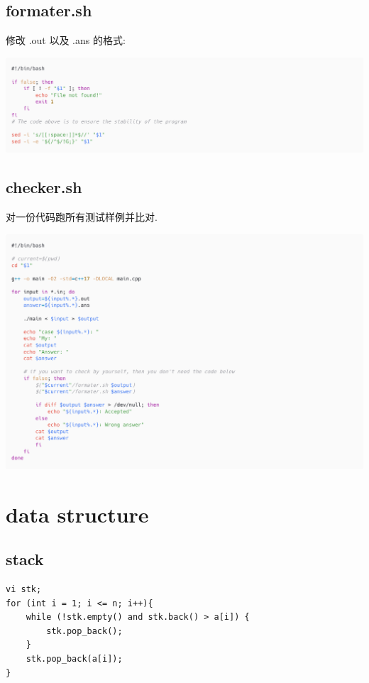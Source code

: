 \documentclass[UTF8, a4paper, titlepage, twoside]{ctexart}
\begin{document}
\subsection{ formater.sh }

修改 .out 以及 .ans 的格式:

\begin{center}
	\includegraphics[width=17cm]{graphs/formater.png}
\end{center}

\subsection{ checker.sh }
对一份代码跑所有测试样例并比对.

\begin{center}
	\includegraphics[width=17cm]{graphs/checker.png}
\end{center}

\newpage
\section{ data structure }

\subsection{ stack }
\begin{lstlisting}[style=cpp]
vi stk;
for (int i = 1; i <= n; i++){
    while (!stk.empty() and stk.back() > a[i]) {
        stk.pop_back();
    }
    stk.pop_back(a[i]);
}
\end{lstlisting}
\end{document}
